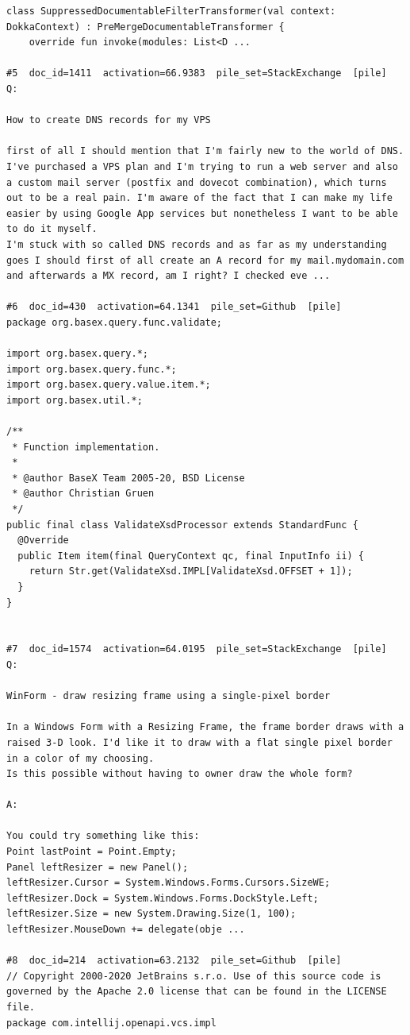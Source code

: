 \begin{verbatim}
class SuppressedDocumentableFilterTransformer(val context: DokkaContext) : PreMergeDocumentableTransformer {
    override fun invoke(modules: List<D ...

#5  doc_id=1411  activation=66.9383  pile_set=StackExchange  [pile]
Q:

How to create DNS records for my VPS

first of all I should mention that I'm fairly new to the world of DNS. I've purchased a VPS plan and I'm trying to run a web server and also a custom mail server (postfix and dovecot combination), which turns out to be a real pain. I'm aware of the fact that I can make my life easier by using Google App services but nonetheless I want to be able to do it myself. 
I'm stuck with so called DNS records and as far as my understanding goes I should first of all create an A record for my mail.mydomain.com and afterwards a MX record, am I right? I checked eve ...

#6  doc_id=430  activation=64.1341  pile_set=Github  [pile]
package org.basex.query.func.validate;

import org.basex.query.*;
import org.basex.query.func.*;
import org.basex.query.value.item.*;
import org.basex.util.*;

/**
 * Function implementation.
 *
 * @author BaseX Team 2005-20, BSD License
 * @author Christian Gruen
 */
public final class ValidateXsdProcessor extends StandardFunc {
  @Override
  public Item item(final QueryContext qc, final InputInfo ii) {
    return Str.get(ValidateXsd.IMPL[ValidateXsd.OFFSET + 1]);
  }
}


#7  doc_id=1574  activation=64.0195  pile_set=StackExchange  [pile]
Q:

WinForm - draw resizing frame using a single-pixel border

In a Windows Form with a Resizing Frame, the frame border draws with a raised 3-D look. I'd like it to draw with a flat single pixel border in a color of my choosing.
Is this possible without having to owner draw the whole form?

A:

You could try something like this:
Point lastPoint = Point.Empty;
Panel leftResizer = new Panel();
leftResizer.Cursor = System.Windows.Forms.Cursors.SizeWE;
leftResizer.Dock = System.Windows.Forms.DockStyle.Left;
leftResizer.Size = new System.Drawing.Size(1, 100);
leftResizer.MouseDown += delegate(obje ...

#8  doc_id=214  activation=63.2132  pile_set=Github  [pile]
// Copyright 2000-2020 JetBrains s.r.o. Use of this source code is governed by the Apache 2.0 license that can be found in the LICENSE file.
package com.intellij.openapi.vcs.impl


\end{verbatim}
